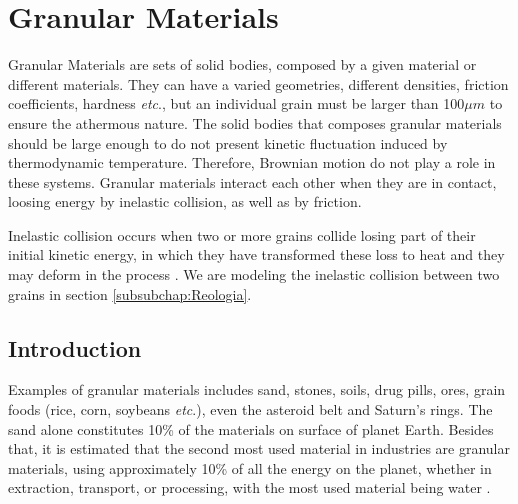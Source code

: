 
\chapter{Granular Materials}
\label{chap:Trabalhos-Relacionados}
    Granular Materials are sets of solid bodies, composed by a given material or different materials. They can have a varied geometries, different densities, friction coefficients, hardness \textit{etc}., but an individual grain must be larger than 100$\mu m$ \cite{Sands_Powders_and_Grains} to ensure the athermous nature. The solid bodies that composes granular materials should be large enough to do not present kinetic fluctuation induced by thermodynamic temperature. Therefore, Brownian motion do not play a role in these systems. Granular materials interact each other when they are in contact, loosing energy by inelastic collision, as well as by friction.

Inelastic collision occurs when two or more grains collide losing part of their initial kinetic energy, in which they have transformed these loss to heat and they may deform in the process \cite{Halliday}. We are modeling the inelastic collision between two grains in section \ref{subsubchap:Reologia}.

\section{Introduction}
\label{subsection:Teoria}

    Examples of granular materials includes sand, stones, soils, drug pills, ores, grain foods (rice, corn, soybeans \textit{etc}.), even the asteroid belt and Saturn's rings. The sand alone constitutes 10\% of the materials on surface of planet Earth. Besides that, it is estimated that the second most used material in industries are granular materials, using approximately 10\% of all the energy on the planet, whether in extraction, transport, or processing, with the most used material being water \cite{Sands_Powders_and_Grains}.

